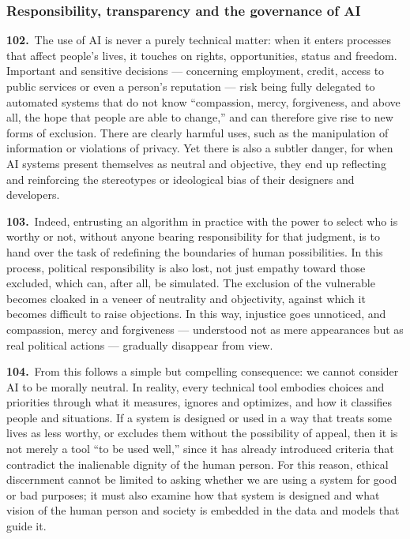 \documentclass{article}
\begin{document}
\subsubsection{Responsibility, transparency and the governance of AI}

\textbf{102.}\ The use of AI is never a purely technical matter: when it enters processes that affect people's lives, it touches on rights, opportunities, status and freedom. Important and sensitive decisions --- concerning employment, credit, access to public services or even a person's reputation --- risk being fully delegated to automated systems that do not know ``compassion, mercy, forgiveness, and above all, the hope that people are able to change,''\cite{n125} and can therefore give rise to new forms of exclusion. There are clearly harmful uses, such as the manipulation of information or violations of privacy. Yet there is also a subtler danger, for when AI systems present themselves as neutral and objective, they end up reflecting and reinforcing the stereotypes or ideological bias of their designers and developers.

\textbf{103.}\ Indeed, entrusting an algorithm in practice with the power to select who is worthy or not, without anyone bearing responsibility for that judgment, is to hand over the task of redefining the boundaries of human possibilities. In this process, political responsibility is also lost, not just empathy toward those excluded, which can, after all, be simulated. The exclusion of the vulnerable becomes cloaked in a veneer of neutrality and objectivity, against which it becomes difficult to raise objections. In this way, injustice goes unnoticed, and compassion, mercy and forgiveness --- understood not as mere appearances but as real political actions --- gradually disappear from view.

\textbf{104.}\ From this follows a simple but compelling consequence: we cannot consider AI to be morally neutral. In reality, every technical tool embodies choices and priorities through what it measures, ignores and optimizes, and how it classifies people and situations. If a system is designed or used in a way that treats some lives as less worthy, or excludes them without the possibility of appeal, then it is not merely a tool ``to be used well,'' since it has already introduced criteria that contradict the inalienable dignity of the human person. For this reason, ethical discernment cannot be limited to asking whether we are using a system for good or bad purposes; it must also examine how that system is designed and what vision of the human person and society is embedded in the data and models that guide it.\cite{n126}
\end{document}
